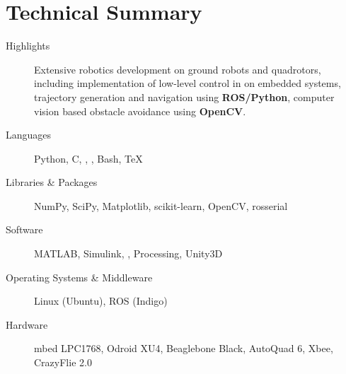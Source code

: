 \documentclass{simplecv}
\begin{document}
\maketitle
\vfill
\section{Technical Summary}
\begin{minipage}{\textwidth}
\begin{description}
    \item[Highlights]
        Extensive robotics development on ground robots and quadrotors, including implementation of low-level control in \textbf{\CPP} on embedded systems, trajectory generation and navigation using \textbf{ROS/Python}, computer vision based obstacle avoidance using \textbf{OpenCV}.
\item[Languages]
    Python,
    C,
    \CPP,
    \CSharp,
    Bash,
    \TeX

\item[Libraries \& Packages]
    NumPy,
    SciPy,
    Matplotlib,
    scikit-learn,
    OpenCV,
    rosserial

\item[Software]
    MATLAB,
  Simulink,
  ,
  Processing,
  Unity3D

\item[Operating Systems \& Middleware]
    Linux (Ubuntu),
    ROS (Indigo)
\item[Hardware]
    mbed LPC1768,
    Odroid XU4,
    Beaglebone Black,
    AutoQuad 6,
    Xbee,
    CrazyFlie 2.0
\end{description}
\end{minipage}

\vfill
\end{document}
